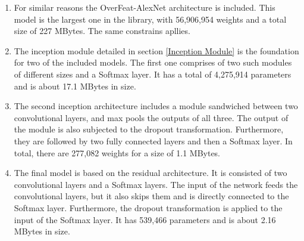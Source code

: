 \begin{enumerate}
    \item For similar reasons the OverFeat-AlexNet architecture is included. This model is the largest one in the library, with 56,906,954 weights and a total size of 227 MBytes. The same constrains apllies.
    
    \item The inception module detailed in section \ref{Inception Module} is the foundation for two of the included models. The first one comprises of two such modules of different sizes and a Softmax layer. It has a total of 4,275,914 parameters and is about 17.1 MBytes in size.
    
    \item The second inception architecture includes a module sandwiched between two convolutional layers, and max pools the outputs of all three. The output of the module is also subjected to the dropout transformation. Furthermore, they are followed by two fully connected layers and then a Softmax layer. In total, there are 277,082 weights for a size of 1.1 MBytes.
    
    \item The final model is based on the residual architecture. It is consisted of two convolutional layers and a Softmax layers. The input of the network feeds the convolutional layers, but it also skips them and is directly connected to the Softmax layer. Furthermore, the dropout transformation is applied to the input of the Softmax layer. It has 539,466 parameters and is about 2.16 MBytes in size.
\end{enumerate}
